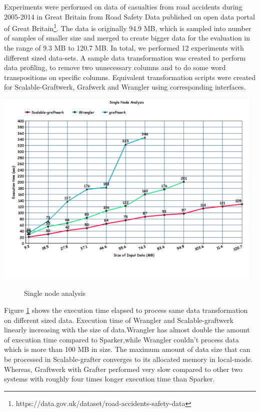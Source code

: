 Experiments were performed on data of casualties from road accidents during 2005-2014 in Great Britain from Road Safety Data published on open data portal of Great Britain\footnote{https://data.gov.uk/dataset/road-accidents-safety-data}. The data is originally 94.9 MB, which is sampled into number of samples of smaller size and merged to create bigger data for the evaluation in the range of 9.3 MB to 120.7 MB. In total, we performed 12 experiments with different sized data-sets. A sample data transformation was created to perform data profiling, to remove two unnecessary columns and to do some word transpositions on specific columns. Equivalent transformation scripts were created for Scalable-Graftwerk, Grafwerk and Wrangler using corresponding interfaces. 
\begin{center}
	\includegraphics[width=35em]{./Figures/single-node}
	\begin{figure}[htbp]
    \caption{Single node analysis}
    \label{fig:singlenode}
	\end{figure}
\end{center}
Figure \ref{fig:singlenode} shows the execution time elapsed to process same data transformation on different sized data. Execution time of Wrangler and Scalable-graftwerk linearly increasing with the size of data.Wrangler has almost double the amount of execution time compared to Sparker,while Wrangler couldn't process data which is more than 100 MB in size. The maximum amount of data size that can be processed in Scalable-grafter converges to its allocated memory in local-mode. Whereas, Graftwerk with Grafter performed very slow compared to other two systems with roughly four times longer execution time than Sparker.

